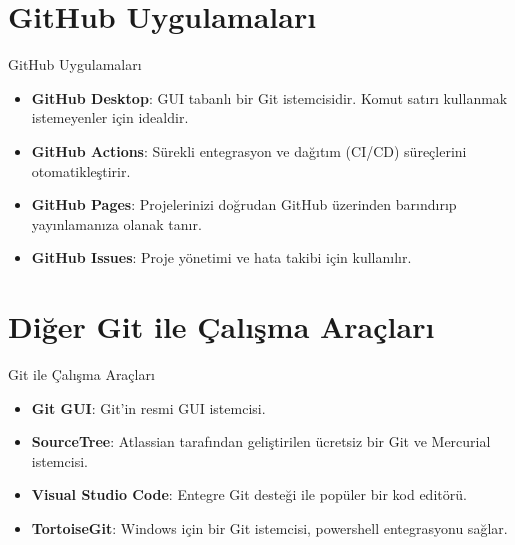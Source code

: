 \documentclass{beamer}
\begin{document}
\section{GitHub Uygulamaları}
\begin{frame}{GitHub Uygulamaları}
    \begin{itemize}
        \item \textbf{GitHub Desktop}: GUI tabanlı bir Git istemcisidir. Komut satırı kullanmak istemeyenler için idealdir.
        \item \textbf{GitHub Actions}: Sürekli entegrasyon ve dağıtım (CI/CD) süreçlerini otomatikleştirir.
        \item \textbf{GitHub Pages}: Projelerinizi doğrudan GitHub üzerinden barındırıp yayınlamanıza olanak tanır.
        \item \textbf{GitHub Issues}: Proje yönetimi ve hata takibi için kullanılır.
    \end{itemize}
\end{frame}

\section{Diğer Git ile Çalışma Araçları}
\begin{frame}{Git ile Çalışma Araçları}
    \begin{itemize}
        \item \textbf{Git GUI}: Git'in resmi GUI istemcisi.
        \item \textbf{SourceTree}: Atlassian tarafından geliştirilen ücretsiz bir Git ve Mercurial istemcisi.
        \item \textbf{Visual Studio Code}: Entegre Git desteği ile popüler bir kod editörü.
        \item \textbf{TortoiseGit}: Windows için bir Git istemcisi, powershell entegrasyonu sağlar.
    \end{itemize}
\end{frame}

\end{document}
